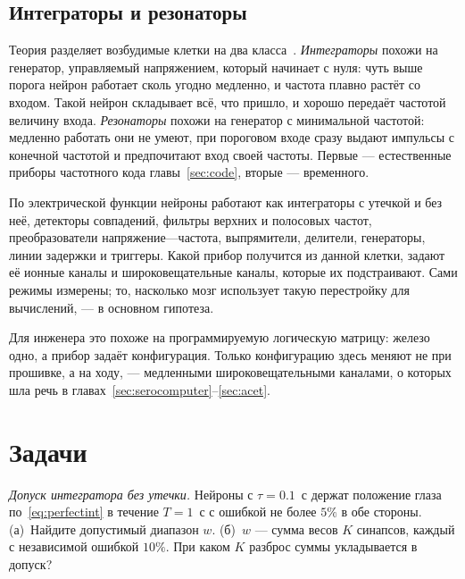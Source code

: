 \subsection{Интеграторы и резонаторы}

Теория разделяет возбудимые клетки на два класса~\cite{Izhikevich2007}. \emph{Интеграторы} похожи на генератор, управляемый напряжением, который начинает с нуля: чуть выше порога нейрон работает сколь угодно медленно, и частота плавно растёт со входом. Такой нейрон складывает всё, что пришло, и хорошо передаёт частотой величину входа. \emph{Резонаторы} похожи на генератор с минимальной частотой: медленно работать они не умеют, при пороговом входе сразу выдают импульсы с конечной частотой и предпочитают вход своей частоты. Первые --- естественные приборы частотного кода главы~\ref{sec:code}, вторые --- временного.

\begin{keyblock}
\begin{proposition}
\label{prop:eetypes}
По электрической функции нейроны работают как интеграторы с утечкой и без неё, детекторы совпадений, фильтры верхних и полосовых частот, преобразователи напряжение---частота, выпрямители, делители, генераторы, линии задержки и триггеры. Какой прибор получится из данной клетки, задают её ионные каналы и широковещательные каналы, которые их подстраивают. Сами режимы измерены; то, насколько мозг использует такую перестройку для вычислений, --- в основном гипотеза.
\end{proposition}
\end{keyblock}

Для инженера это похоже на программируемую логическую матрицу: железо одно, а прибор задаёт конфигурация. Только конфигурацию здесь меняют не при прошивке, а на ходу, --- медленными широковещательными каналами, о которых шла речь в главах~\ref{sec:serocomputer}--\ref{sec:acet}.

\section{Задачи}

\begin{exercise}[\lvlA]
\label{ex:18:1}
\emph{Допуск интегратора без утечки.} Нейроны с $\tau=0.1$~с держат положение глаза по~\eqref{eq:perfectint} в течение $T=1$~с с ошибкой не более $5\%$ в обе стороны. (а)~Найдите допустимый диапазон $w$. (б)~$w$ --- сумма весов $K$ синапсов, каждый с независимой ошибкой $10\%$. При каком $K$ разброс суммы укладывается в допуск?
\end{exercise}

